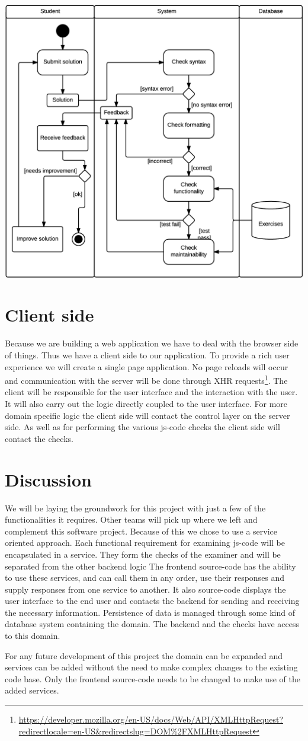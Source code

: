 \includegraphics[scale=0.75]{diagrams-images/code-submission-activity-diagram}

\section{Client side}
Because we are building a web application
we have to deal with the browser side of things.
Thus we have a client side to our application.
To provide a rich user experience we will create a single page application.
No page reloads will occur
and communication with the server will be done through
XHR requests\footnote{\url{https://developer.mozilla.org/en-US/docs/Web/API/XMLHttpRequest?redirectlocale=en-US&redirectslug=DOM\%2FXMLHttpRequest}}.
The client will be responsible for the user interface
and the interaction with the user.
It will also carry out the logic directly coupled to the user interface.
For more domain specific logic
the client side will contact the control layer on the server side.
As well as for performing the various \gls{js-code} checks
the client side will contact the checks.

\section{Discussion}
We will be laying the groundwork for this project
with just a few of the functionalities it requires.
Other teams will pick up where we left and complement this software project.
Because of this we chose to use a service oriented approach.
Each functional requirement for examining \gls{js-code}
will be encapsulated in a service.
They form the checks of the \gls{examiner}
and will be separated from the other backend logic
The frontend \gls{source-code} has the ability to use these services,
and can call them in any order, use their responses
and supply responses from one service to another.
It also \gls{source-code} displays the user interface to the end user
and contacts the backend for sending and receiving the necessary information.
Persistence of data is managed through some kind of database system
containing the domain.
The backend and the checks have access to this domain.

For any future development of this project
the domain can be expanded
and services can be added
without the need to make complex changes to the existing code base.
Only the frontend \gls{source-code} needs to be changed
to make use of the added services.
